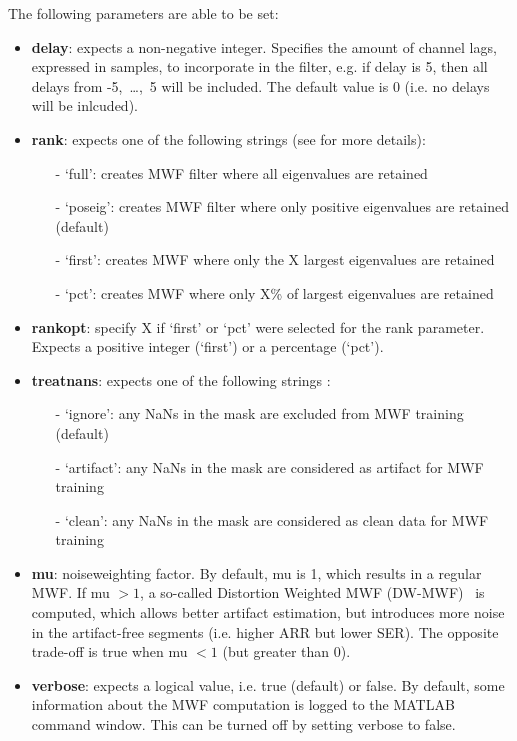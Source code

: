 \documentclass[11pt]{article}
\begin{document}
The following parameters are able to be set:

\begin{itemize}
\item \textbf{delay}: expects a non-negative integer. Specifies the amount of channel lags, expressed in samples, to incorporate in the filter, e.g. if delay is 5, then all delays from -5,~\ldots,~5 will be included. The default value is 0 (i.e. no delays will be inlcuded).

\item \textbf{rank}: expects one of the following strings (see \cite{somers2018generic} for more details):
\begin{itemize}
\item[-] `full': creates MWF filter where all eigenvalues are retained
\item[-] `poseig': creates MWF filter where only positive eigenvalues are retained (default)
\item[-] `first': creates MWF where only the X largest eigenvalues are retained
\item[-] `pct': creates MWF where only X\% of largest eigenvalues are retained
\end{itemize}

\item \textbf{rankopt}: specify X if `first' or `pct' were selected for the rank parameter. Expects a positive integer (`first') or a percentage (`pct').

\item \textbf{treatnans}: expects one of the following strings :
\begin{itemize}
\item[-] `ignore': any NaNs in the mask are excluded from MWF training (default)
\item[-] `artifact': any NaNs in the mask are considered as artifact for MWF training
\item[-] `clean': any NaNs in the mask are considered as clean data for MWF training
\end{itemize}

\item \textbf{mu}: noiseweighting factor. By default, mu is 1, which results in a regular MWF. If mu $> 1$, a so-called Distortion Weighted MWF (DW-MWF)~\cite{serizel2010integrated} is computed, which allows better artifact estimation, but introduces more noise in the artifact-free segments (i.e. higher ARR but lower SER). The opposite trade-off is true when mu $< 1$ (but greater than 0).

\item \textbf{verbose}: expects a logical value, i.e. true (default) or false. By default, some information about the MWF computation is logged to the MATLAB command window. This can be turned off by setting verbose to false.

\end{itemize}
\end{document}
